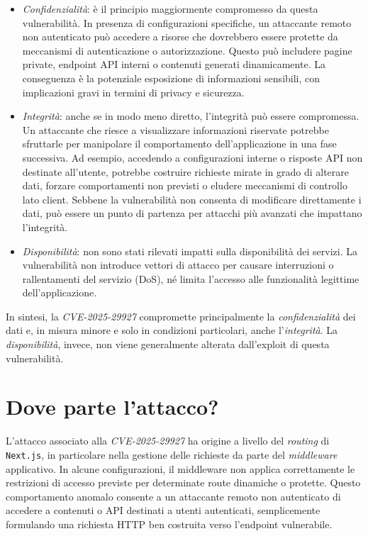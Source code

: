 \documentclass[a4paper,oneside,12pt]{report}
\begin{document}
\begin{itemize}
  \item \emph{Confidenzialità}: è il principio maggiormente compromesso da questa vulnerabilità. In presenza di configurazioni specifiche, un attaccante remoto non autenticato può accedere a risorse che dovrebbero essere protette da meccanismi di autenticazione o autorizzazione. Questo può includere pagine private, endpoint API interni o contenuti generati dinamicamente. La conseguenza è la potenziale esposizione di informazioni sensibili, con implicazioni gravi in termini di privacy e sicurezza.
  \item \emph{Integrità}: anche se in modo meno diretto, l’integrità può essere compromessa. Un attaccante che riesce a visualizzare informazioni riservate potrebbe sfruttarle per manipolare il comportamento dell'applicazione in una fase successiva. Ad esempio, accedendo a configurazioni interne o risposte API non destinate all’utente, potrebbe costruire richieste mirate in grado di alterare dati, forzare comportamenti non previsti o eludere meccanismi di controllo lato client. Sebbene la vulnerabilità non consenta di modificare direttamente i dati, può essere un punto di partenza per attacchi più avanzati che impattano l'integrità.
  \item \emph{Disponibilità}: non sono stati rilevati impatti sulla disponibilità dei servizi. La vulnerabilità non introduce vettori di attacco per causare interruzioni o rallentamenti del servizio (DoS), né limita l’accesso alle funzionalità legittime dell’applicazione.
\end{itemize}

In sintesi, la \emph{CVE-2025-29927} compromette principalmente la \emph{confidenzialità} dei dati e, in misura minore e solo in condizioni particolari, anche l’\emph{integrità}. La \emph{disponibilità}, invece, non viene generalmente alterata dall’exploit di questa vulnerabilità.

\section{Dove parte l'attacco?}
\label{sec:dove-parte-attacco}

L'attacco associato alla \emph{CVE-2025-29927} ha origine a livello del \emph{routing} di \texttt{Next.js}, in particolare nella gestione delle richieste da parte del \emph{middleware} applicativo. In alcune configurazioni, il middleware non applica correttamente le restrizioni di accesso previste per determinate route dinamiche o protette. Questo comportamento anomalo consente a un attaccante remoto non autenticato di accedere a contenuti o API destinati a utenti autenticati, semplicemente formulando una richiesta HTTP ben costruita verso l’endpoint vulnerabile.
\end{document}
